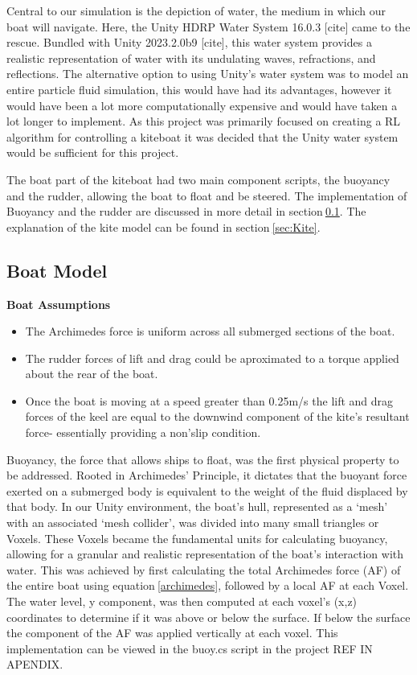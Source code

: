 Central to our simulation is the depiction of water, the medium in which our boat will navigate. Here, the Unity HDRP Water System 16.0.3 [cite] came to the rescue. Bundled with Unity 2023.2.0b9 [cite], this water system provides a realistic representation of water with its undulating waves, refractions, and reflections. 
The alternative option to using Unity's water system was to model an entire particle fluid simulation, this would have had its advantages, however it would have been a lot more computationally expensive and would have taken a lot longer to implement. As this project was primarily focused on creating a RL algorithm for controlling a kiteboat it was decided that the Unity water system would be sufficient for this project.  

The boat part of the kiteboat had two main component scripts, the buoyancy and the rudder, allowing the boat to float and be steered. The implementation of Buoyancy and the rudder are discussed in more detail in section$~$\ref{sec:Boat}. The explanation of the kite model can be found in section$~$\ref{sec:Kite}.


\subsection{Boat Model}\label{sec:Boat}

\textbf{Boat Assumptions}
\begin{itemize}
    \item The Archimedes force is uniform across all submerged sections of the boat.
    \item The rudder forces of lift and drag could be aproximated to a torque applied about the rear of the boat.
    \item Once the boat is moving at a speed greater than 0.25m/s the lift and drag forces of the keel are equal to the downwind component of the kite's resultant force- essentially providing a non'slip condition.
\end{itemize}
Buoyancy, the force that allows ships to float, was the first physical property to be addressed. Rooted in Archimedes' Principle, it dictates that the buoyant force exerted on a submerged body is equivalent to the weight of the fluid displaced by that body. In our Unity environment, the boat's hull, represented as a `mesh' with an associated `mesh collider', was divided into many small triangles or Voxels. These Voxels became the fundamental units for calculating buoyancy, allowing for a granular and realistic representation of the boat's interaction with water. This was achieved by first calculating the total Archimedes force (AF) of the entire boat using equation$~$\ref{archimedes}, followed by a local AF at each Voxel. The water level, y component, was then computed at each voxel's (x,z) coordinates to determine if it was above or below the surface. If below the surface the component of the AF was applied vertically at each voxel. This implementation can be viewed in the buoy.cs script in the project REF IN APENDIX.

